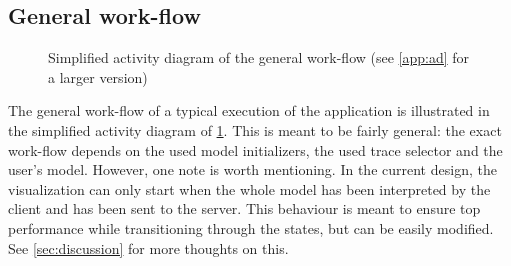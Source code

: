 \documentclass[a4paper]{article}
\begin{document}
	
	\subsection{General work-flow}
	\begin{figure}[ht]
		\centering
		\caption{Simplified activity diagram of the general work-flow (see \cref{app:ad} for a larger version)}
		\label{fig:ad_generalworkflow}
	\end{figure}
	The general work-flow of a typical execution of the application is illustrated in the simplified activity diagram of \cref{fig:ad_generalworkflow}. This is meant to be fairly general: the exact work-flow depends on the used model initializers, the used trace selector and the user's model. However, one note is worth mentioning. In the current design, the visualization can only start when the whole model has been interpreted by the client and has been sent to the server. This behaviour is meant to ensure top performance while transitioning through the states, but can be easily modified. See \cref{sec:discussion} for more thoughts on this.
	
	
\end{document}
